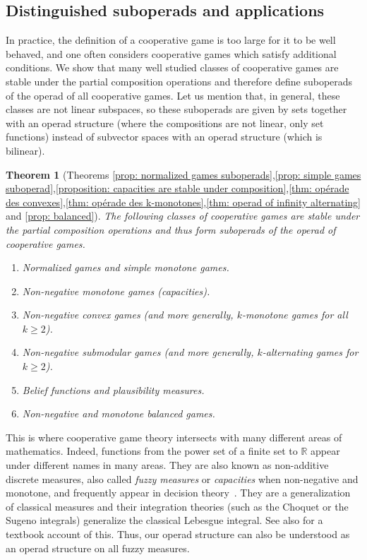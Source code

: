 \documentclass[a4paper,12pt]{amsart}
\newtheorem{theoremintro}{Theorem}
\begin{document}
\subsection*{Distinguished suboperads and applications} In practice, the definition of a cooperative game is too large for it to be well behaved, and one often considers cooperative games which satisfy additional conditions. We show that many well studied classes of cooperative games are stable under the partial composition operations and therefore define suboperads of the operad of all cooperative games. Let us mention that, in general, these classes are not linear subspaces, so these suboperads are given by sets together with an operad structure (where the compositions are not linear, only set functions) instead of subvector spaces with an operad structure (which is bilinear). 

\begin{theoremintro}[Theorems \ref{prop: normalized games suboperads},\ref{prop: simple games suboperad},\ref{proposition: capacities are stable under composition},\ref{thm: opérade des convexes},\ref{thm: opérade des k-monotones},\ref{thm: operad of infinity alternating} and \ref{prop: balanced}]\label{thmintro: suboperads}
The following classes of cooperative games are stable under the partial composition operations and thus form suboperads of the operad of cooperative games.
\begin{enumerate}
\item Normalized games and simple monotone games.

\item Non-negative monotone games (capacities).

\item Non-negative convex games (and more generally, $k$-monotone games for all $k \geq 2$). 

\item Non-negative submodular games (and more generally, $k$-alternating games for $k \geq 2$). 

\item Belief functions and plausibility measures.

\item Non-negative and monotone balanced games.
\end{enumerate}
\end{theoremintro}

This is where cooperative game theory intersects with many different areas of mathematics. Indeed, functions from the power set of a finite set to $\mathbb{R}$ appear under different names in many areas. They are also known as non-additive discrete measures, also called \textit{fuzzy measures} or \emph{capacities} when non-negative and monotone, and frequently appear in decision theory~\cite{choquet1954theory, Sugeno, grabisch2010decade}. They are a generalization of classical measures and their integration theories (such as the Choquet or the Sugeno integrals) generalize the classical Lebesgue integral. See also \cite{Grabisch} for a textbook account of this. Thus, our operad structure can also be understood as an operad structure on all fuzzy measures. 
\end{document}

